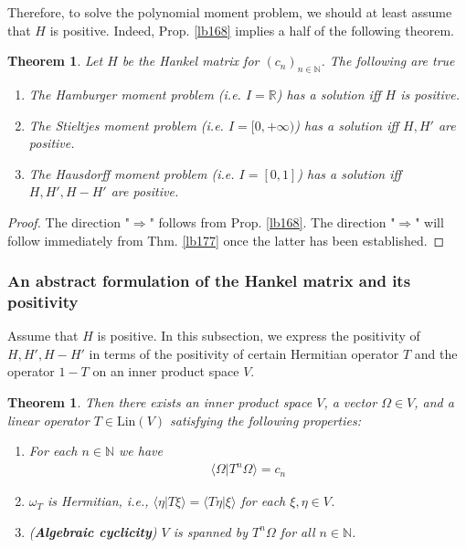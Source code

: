 \documentclass[12pt,b5paper,notitlepage]{article}
\theoremstyle{definition}
\theoremstyle{plain}
\newtheorem{thm}[df]{Theorem}
\newcommand{\bk}[1]{\langle {#1}\rangle}
\newcommand{\Nbb}{\mathbb N}
\newcommand{\Rbb}{\mathbb R}
\newcommand{\Lin}{\mathrm{Lin}}
\numberwithin{equation}{section}
\begin{document}
Therefore, to solve the polynomial moment problem, we should at least assume that $H$ is positive. Indeed, Prop. \ref{lb168} implies a half of the following theorem.
\begin{thm}\label{lb169}
Let $H$ be the Hankel matrix for $(c_n)_{n\in\Nbb}$. The following are true
\begin{enumerate}
\item The Hamburger moment problem (i.e. $I=\Rbb$) has a solution iff $H$ is positive.
\item The Stieltjes moment problem (i.e. $I=[0,+\infty)$) has a solution iff $H,H'$ are positive.
\item The Hausdorff moment problem (i.e. $I=[0,1]$) has a solution iff $H,H',H-H'$ are positive.
\end{enumerate}
\end{thm}


\begin{proof}
The direction "$\Rightarrow$" follows from Prop. \ref{lb168}. The direction "$\Rightarrow$" will follow immediately from Thm. \ref{lb177} once the latter has been established.
\end{proof}



\subsubsection{An abstract formulation of the Hankel matrix and its positivity}

Assume that $H$ is positive. In this subsection, we express the positivity of $H,H',H-H'$ in terms of the positivity of certain Hermitian operator $T$ and the operator $1-T$ on an inner product space $V$.

\begin{thm}\label{lb167}
Then there exists an inner product space $V$, a vector $\Omega\in V$, and a linear operator $T\in\Lin(V)$ satisfying the following properties:
\begin{enumerate}[label=(\arabic*)]
\item For each $n\in\Nbb$ we have
\begin{align}\label{eq85}
\bk{\Omega|T^n\Omega}=c_n
\end{align}
\item $\omega_T$ is Hermitian, i.e., $\bk{\eta|T\xi}=\bk{T\eta|\xi}$ for each $\xi,\eta\in V$.
\item (\textbf{Algebraic cyclicity}) $V$ is spanned by $T^n\Omega$ for all $n\in\Nbb$.
\end{enumerate}
\end{thm}
\end{document}
